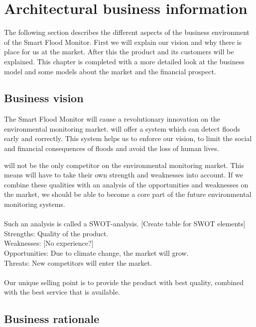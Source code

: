 \chapter{Architectural business information}
\label{ch:business}
The following section describes the different aspects of the business environment of the Smart Flood Monitor. First we will explain our vision and why there is place for us at the market. After this the product and its customers will be explained. This chapter is completed with a more detailed look at the business model and some models about the market and the financial prospect.

\section{Business vision}
The Smart Flood Monitor will cause a revolutionary innovation on the environmental monitoring market. \CompanyName will offer a system which can detect floods early and correctly. This system helps us to enforce our vision, to limit the social and financial consequences of floods and avoid the loss of human lives. 

\CompanyName will not be the only competitor on the environmental monitoring market. This means \CompanyName will have to take their own strength and weaknesses into account. If we combine these qualities with an analysis of the opportunities and weaknesses on the market, we should be able to become a core part of the future environmental monitoring systems.\\\\

Such an analysis is called a SWOT-analysis. 
[Create table for SWOT elements]\\
Strengths: Quality of the product.\\ 
Weaknesses: [No experience?]\\
Opportunities: Due to climate change, the market will grow. \\
Threats: New competitors will enter the market.\\\\

Our unique selling point is to provide the product with best quality, combined with the best service that is available.

\section{Business rationale}


